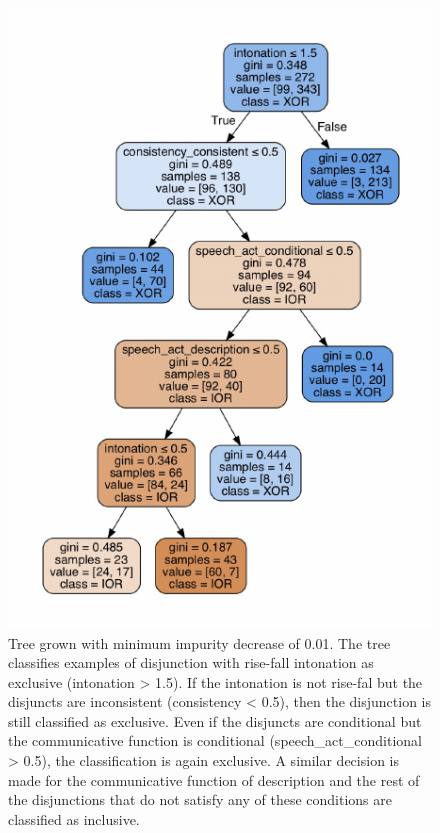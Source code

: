 \documentclass[oneside]{report}
\theoremstyle{definition}
\theoremstyle{definition}
\theoremstyle{definition}
\theoremstyle{remark}
\begin{document}
\begin{figure}
\centering
\includegraphics{figs/binaryHighFeatures-1.pdf}
\caption{\label{fig:binaryHighFeatures}Tree grown with minimum impurity
decrease of 0.01. The tree classifies examples of disjunction with
rise-fall intonation as exclusive (intonation \textgreater{} 1.5). If
the intonation is not rise-fal but the disjuncts are inconsistent
(consistency \textless{} 0.5), then the disjunction is still classified
as exclusive. Even if the disjuncts are conditional but the
communicative function is conditional (speech\_act\_conditional
\textgreater{} 0.5), the classification is again exclusive. A similar
decision is made for the communicative function of description and the
rest of the disjunctions that do not satisfy any of these conditions are
classified as inclusive.}
\end{figure}
\end{document}
